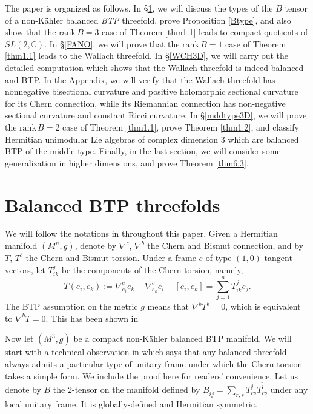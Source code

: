 \documentclass{amsart}
\numberwithin{equation}{section}
\theoremstyle{definition}
\renewcommand{\1}{\mathds{1}}
\renewcommand{\>}{\rightarrow}
\begin{document}
The paper is organized as follows.  In \S \ref{BS3D}, we will discuss the types of the $B$ tensor of a non-K\"ahler balanced {\em BTP} threefold, prove Proposition \ref{Btype}, and also show that the $\mathrm{rank}\,B=3$ case of Theorem \ref{thm1.1} leads to compact quotients of $SL(2,{\mathbb C})$. In \S \ref{FANO}, we will prove that the $\mathrm{rank}\,B=1$ case of Theorem \ref{thm1.1} leads to the Wallach threefold. In \S \ref{WCH3D}, we will carry out the detailed computation which shows that the Wallach threefold is indeed balanced and  BTP. In the Appendix, we will verify that the Wallach threefold has nonnegative bisectional curvature and positive holomorphic sectional curvature for its Chern connection, while its Riemannian connection has non-negative sectional curvature and constant Ricci curvature. In \S \ref{mddtype3D}, we will prove the $\mbox{rank}\,B=2$ case of Theorem \ref{thm1.1}, prove Theorem \ref{thm1.2}, and classify Hermitian unimodular Lie algebras of complex dimension $3$
which are balanced BTP of the middle type. Finally, in the last section, we will consider some generalization in higher dimensions, and prove Theorem \ref{thm6.3}.



\vspace{0.4cm}

\section{Balanced BTP threefolds}\label{BS3D}

We will follow the notations in \cite{ZhaoZ24} throughout this paper. Given a Hermitian manifold $(M^n,g)$, denote by $\nabla^c$, $\nabla^b$ the Chern and Bismut connection, and by $T$, $T^b$ the Chern and Bismut torsion. Under a frame $e$ of type $(1,0)$ tangent vectors, let $T^j_{ik}$ be the components of the Chern torsion, namely,
$$ T(e_i,e_k) := \nabla^c_{e_i}e_k - \nabla^c_{e_k}e_i - [e_i, e_k] = \sum_{j=1}^n T^j_{ik} e_j. $$
The BTP assumption on the metric $g$ means that $\nabla^bT^b=0$, which is equivalent to $\nabla^bT=0$.
This has been shown in \cite[the proof of Proposition 1]{ZhaoZ19Str}

Now let $(M^3,g)$ be a compact non-K\"ahler balanced BTP manifold. We will start with a technical observation in \cite[Proposition 2]{ZhouZ} which says that any balanced threefold always admits a particular type of unitary frame under which the Chern torsion takes a simple form. We include the proof here for readers' convenience. Let us denote by $B$  the $2$-tensor on the manifold  defined by $B_{i\overline{j}}=\sum_{r,s} T^j_{rs}\overline{T^i_{rs}}$ under any local unitary frame. It is  globally-defined and Hermitian symmetric.
\end{document}

